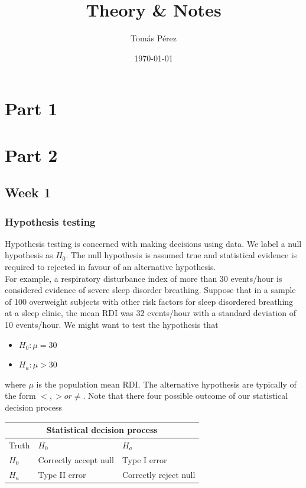 \documentclass{homework}
\author{Tomás Pérez}
\date{\today}
\title{Theory \& Notes}
\begin{document}
 \maketitle

\section{Part 1}
\section{Part 2}
\subsection{Week 1}

\subsubsection{Hypothesis testing}

Hypothesis testing is concerned with making decisions using data. We label a null hypothesis as $H_0$. The null hypothesis is assumed true and statistical evidence is required to rejected in favour of an alternative hypothesis. \\

For example, a respiratory disturbance index of more than 30 events/hour is considered evidence of severe sleep disorder breathing. Suppose that in a sample of 100 overweight subjects with other risk factors for sleep disordered breathing at a sleep clinic, the mean RDI was 32 events/hour with a standard deviation of 10 events/hour. We might want to test the hypothesis that 

\begin{itemize}
    \item $H_0 : \mu = 30$ 
    \item $H_a : \mu > 30$ 
\end{itemize}

where $\mu$ is the population mean RDI. The alternative hypothesis are typically of the form $<,> or \neq$. Note that there four possible outcome of our statistical decision process\\

\begin{center}
\begin{tabular}{ |p{1cm}||p{5cm}|p{5cm}|  }
 \hline
 \multicolumn{3}{|c|}{Statistical decision process} \\
 \hline
 Truth& $H_0$ & $H_a$\\
 \hline
 $H_0$  & Correctly accept null & Type I error\\
 $H_a$ &  Type II error & Correctly reject null\\
 \hline
\end{tabular}
\end{center}
\end{document}
